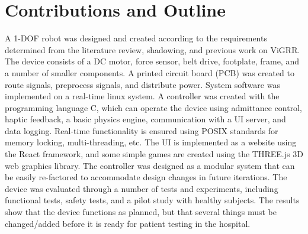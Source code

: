 \documentclass[12pt]{report}
\begin{document}



\section{Contributions and Outline}

A 1-DOF robot was designed and created according to the requirements determined from the literature review, shadowing, and previous work on ViGRR. The device consists of a DC motor, force sensor, belt drive, footplate, frame, and a number of smaller components. A printed circuit board (PCB) was created to route signals, preprocess signals, and distribute power. System software was implemented on a real-time linux system. A controller was created with the programming language C, which can operate the device using admittance control, haptic feedback, a basic physics engine, communication with a UI server, and data logging. Real-time functionality is ensured using POSIX standards for memory locking, multi-threading, etc. The UI is implemented as a website using the React framework, and some simple games are created using the THREE.js 3D web graphics library. The controller was designed as a modular system that can be easily re-factored to accommodate design changes in future iterations. The device was evaluated through a number of tests and experiments, including functional tests, safety tests, and a pilot study with healthy subjects. The results show that the device functions as planned, but that several things must be changed/added before it is ready for patient testing in the hospital.
\end{document}
